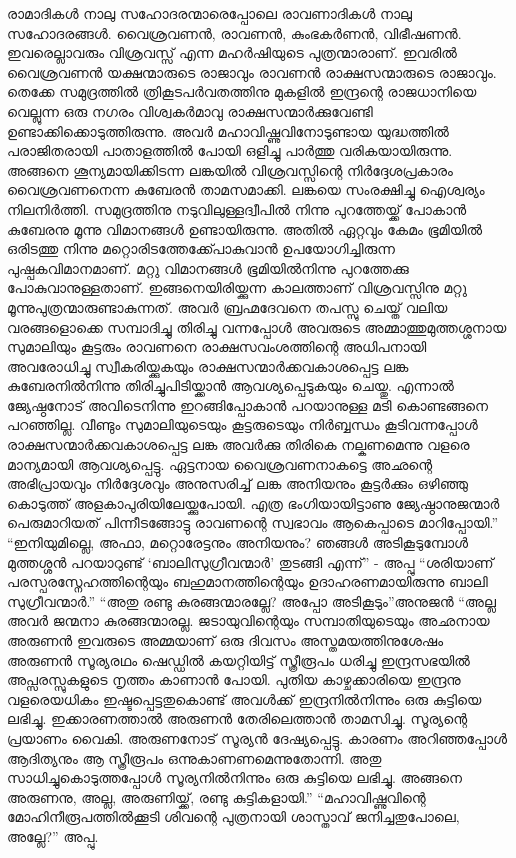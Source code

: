 രാമാദികൾ നാലു സഹോദരന്മാരെപ്പോലെ രാവണാദികൾ നാലു സഹോദരങ്ങൾ. വൈശ്രവണൻ, രാവണൻ, കുംഭകർണൻ, വിഭീഷണൻ. ഇവരെല്ലാവരും വിശ്രവസ്സ് എന്ന മഹർഷിയുടെ പുത്രന്മാരാണ്‌. ഇവരിൽ വൈശ്രവണൻ യക്ഷന്മാരുടെ രാജാവും രാവണൻ രാക്ഷസന്മാരുടെ രാജാവും. തെക്കേ സമുദ്രത്തിൽ ത്രികൂടപർവതത്തിനു മുകളിൽ ഇന്ദ്രന്റെ രാജധാനിയെ വെല്ലുന്ന ഒരു നഗരം വിശ്വകർമാവു രാക്ഷസന്മാർക്കുവേണ്ടി ഉണ്ടാക്കിക്കൊടുത്തിരുന്നു. അവർ മഹാവിഷ്ണുവിനോടുണ്ടായ യുദ്ധത്തിൽ പരാജിതരായി പാതാളത്തിൽ പോയി ഒളിച്ചു പാർത്തു വരികയായിരുന്നു. അങ്ങനെ ശൂന്യമായിക്കിടന്ന ലങ്കയിൽ വിശ്രവസ്സിന്റെ നിർദ്ദേശപ്രകാരം വൈശ്രവണനെന്ന കുബേരൻ താമസമാക്കി. ലങ്കയെ സംരക്ഷിച്ചു ഐശ്വര്യം നിലനിർത്തി. സമുദ്രത്തിനു നടുവിലുള്ളദ്വീപിൽ നിന്നു പുറത്തേയ്ക്ക് പോകാൻ കുബേരനു മൂന്നു വിമാനങ്ങൾ ഉണ്ടായിരുന്നു. അതിൽ ഏറ്റവും കേമം ഭൂമിയിൽ ഒരിടത്തു നിന്നു മറ്റൊരിടത്തേക്ക്പോകുവാൻ ഉപയോഗിച്ചിരുന്ന പുഷ്പകവിമാനമാണ്‌. മറ്റു വിമാനങ്ങൾ ഭൂമിയിൽനിന്നു പുറത്തേക്കു പോകുവാനുള്ളതാണ്‌.
ഇങ്ങനെയിരിയ്ക്കുന്ന കാലത്താണ്‌ വിശ്രവസ്സിനു മറ്റു മൂന്നുപുത്രന്മാരുണ്ടാകുന്നത്. അവർ ബ്രഹ്മദേവനെ തപസ്സു ചെയ്ത് വലിയ വരങ്ങളൊക്കെ സമ്പാദിച്ചു തിരിച്ചു വന്നപ്പോൾ അവരുടെ അമ്മാത്തുമുത്തശ്ശനായ സുമാലിയും കൂട്ടരും രാവണനെ രാക്ഷസവംശത്തിന്റെ അധിപനായി അവരോധിച്ചു സ്വീകരിയ്ക്കുകയും രാക്ഷസന്മാർക്കവകാശപ്പെട്ട ലങ്ക കുബേരനിൽനിന്നു തിരിച്ചുപിടിയ്ക്കാൻ ആവശ്യപ്പെടുകയും ചെയ്തു. എന്നാൽ ജ്യേഷ്ഠനോട് അവിടെനിന്നു ഇറങ്ങിപ്പോകാൻ പറയാനുള്ള മടി കൊണ്ടങ്ങനെ പറഞ്ഞില്ല. വീണ്ടും സുമാലിയുടെയും കൂട്ടരുടെയും നിർബ്ബന്ധം കൂടിവന്നപ്പോൾ രാക്ഷസന്മാർക്കവകാശപ്പെട്ട ലങ്ക അവർക്കു തിരികെ നല്കണമെന്നു വളരെ മാന്യമായി ആവശ്യപ്പെട്ടു. ഏട്ടനായ വൈശ്രവണനാകട്ടെ അഛന്റെ അഭിപ്രായവും നിർദ്ദേശവും അനുസരിച്ച് ലങ്ക അനിയനും കൂട്ടർക്കും ഒഴിഞ്ഞു കൊടുത്ത് അളകാപുരിയിലേയ്ക്കുപോയി. എത്ര ഭംഗിയായിട്ടാണു ജ്യേഷ്ഠാനുജന്മാർ പെരുമാറിയത് പിന്നീടങ്ങോട്ടു രാവണന്റെ സ്വഭാവം ആകെപ്പാടെ മാറിപ്പോയി.”
“ഇനിയുമില്ലെ, അഫാ, മറ്റൊരേട്ടനും അനിയനും? ഞങ്ങൾ അടികൂടുമ്പോൾ മുത്തശ്ശൻ പറയാറുണ്ട് ‘ബാലിസുഗ്രീവന്മാർ’ തുടങ്ങി എന്ന്” - അപ്പു
“ശരിയാണ് പരസ്പരസ്നേഹത്തിന്റെയും ബഹുമാനത്തിന്റെയും ഉദാഹരണമായിരുന്നു ബാലി സുഗ്രീവന്മാർ.”
“അതു രണ്ടു കുരങ്ങന്മാരല്ലേ? അപ്പോ അടികൂടും”അനുജൻ
“അല്ല അവർ ജന്മനാ കുരങ്ങന്മാരല്ല. ജടായുവിന്റെയും സമ്പാതിയുടെയും അഛനായ അരുണൻ ഇവരുടെ അമ്മയാണ്‌ ഒരു ദിവസം അസ്തമയത്തിനുശേഷം അരുണൻ സൂര്യരഥം ഷെഡ്ഡിൽ കയറ്റിയിട്ട് സ്ത്രീരൂപം ധരിച്ചു ഇന്ദ്രസഭയിൽ അപ്സരസ്സുകളുടെ നൃത്തം കാണാൻ പോയി. പുതിയ കാഴ്ചക്കാരിയെ ഇന്ദ്രനു വളരെയധികം ഇഷ്ടപ്പെട്ടതുകൊണ്ട് അവൾക്ക് ഇന്ദ്രനിൽനിന്നും ഒരു കുട്ടിയെ ലഭിച്ചു. ഇക്കാരണത്താൽ അരുണൻ തേരിലെത്താൻ താമസിച്ചു. സൂര്യന്റെ പ്രയാണം വൈകി. അരുണനോട് സൂര്യൻ ദേഷ്യപ്പെട്ടു. കാരണം അറിഞ്ഞപ്പോൾ ആദിത്യനും ആ സ്ത്രീരൂപം ഒന്നുകാണണമെന്നുതോന്നി. അതു സാധിച്ചുകൊടുത്തപ്പോൾ സൂര്യനിൽനിന്നും ഒരു കുട്ടിയെ ലഭിച്ചു. അങ്ങനെ അരുണനു, അല്ല, അരുണിയ്ക്ക്, രണ്ടു കുട്ടികളായി.”
“മഹാവിഷ്ണുവിന്റെ മോഹിനീരൂപത്തിൽക്കൂടി ശിവന്റെ പുത്രനായി ശാസ്താവ് ജനിച്ചതുപോലെ, അല്ലേ?” അപ്പു.
